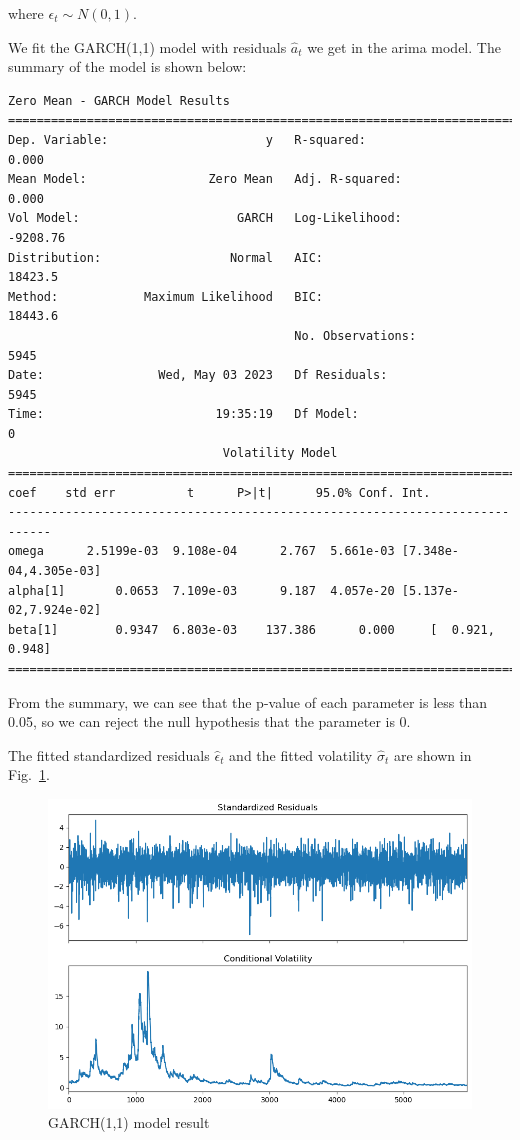 \documentclass[runningheads]{llncs}
\begin{document}
where $\epsilon_t\sim N(0,1)$.

We fit the GARCH(1,1) model with residuals $\hat{a}_t$ we get in the arima model. The summary of the model is shown below:
\begin{verbatim}
Zero Mean - GARCH Model Results                        
==============================================================================
Dep. Variable:                      y   R-squared:                       0.000
Mean Model:                 Zero Mean   Adj. R-squared:                  0.000
Vol Model:                      GARCH   Log-Likelihood:               -9208.76
Distribution:                  Normal   AIC:                           18423.5
Method:            Maximum Likelihood   BIC:                           18443.6
                                        No. Observations:                 5945
Date:                Wed, May 03 2023   Df Residuals:                     5945
Time:                        19:35:19   Df Model:                            0
                              Volatility Model                              
============================================================================             coef    std err          t      P>|t|      95.0% Conf. Int.
----------------------------------------------------------------------------
omega      2.5199e-03  9.108e-04      2.767  5.661e-03 [7.348e-04,4.305e-03]
alpha[1]       0.0653  7.109e-03      9.187  4.057e-20 [5.137e-02,7.924e-02]
beta[1]        0.9347  6.803e-03    137.386      0.000     [  0.921,  0.948]
============================================================================
\end{verbatim}

From the summary, we can see that the p-value of each parameter is less than 0.05, so we can reject the null hypothesis that the parameter is 0.

The fitted standardized residuals $\hat{\epsilon}_t$ and
the fitted volatility $\hat{\sigma}_t$ are shown in Fig.~\ref{fig:9}.


\begin{figure}[htbp]
    \centering
    \includegraphics[width=\textwidth]{../img/garch_result.png}
    \caption{GARCH(1,1) model result}
    \label{fig:9}
\end{figure}
\end{document}
